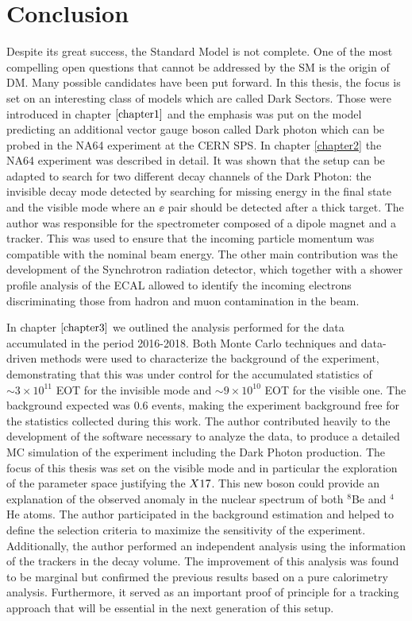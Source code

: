 
\chapter{Conclusion}

\label{chapter6}

Despite its great success, the Standard Model is not complete. One of the most compelling open questions that cannot be addressed by the SM is the origin of DM. Many possible candidates have been put forward. In this thesis, the focus is set on an interesting class of models which are called Dark Sectors. Those were introduced in chapter $\ref{chapter1}$ and the emphasis was put on the model predicting an additional vector gauge boson called Dark photon which can be probed in the NA64 experiment at the CERN SPS. In chapter \ref{chapter2} the NA64 experiment was described in detail. It was shown that the setup can be adapted to search for two different decay channels of the Dark Photon: the invisible decay mode detected by searching for missing energy in the final state and the visible mode where an $\ee$ pair should be detected after a thick target. The author was responsible for the spectrometer composed of a dipole magnet and a tracker. This was used to ensure that the incoming particle momentum was compatible with the nominal beam energy. The other main contribution was the development of the Synchrotron radiation detector, which together with a shower profile analysis of the ECAL allowed to identify the incoming electrons discriminating those from hadron and muon contamination in the beam.

In chapter $\ref{chapter3}$ we outlined the analysis performed for the data accumulated in the period 2016-2018. Both Monte Carlo techniques and data-driven methods were used to characterize the background of the experiment, demonstrating that this was under control for the accumulated statistics of $\sim 3 \times 10^{11}$ EOT for the invisible mode and $\sim 9 \times 10^{10}$ EOT for the visible one. The background expected was 0.6 events, making the experiment background free for the statistics collected during this work. The author contributed heavily to the development of the software necessary to analyze the data, to produce a detailed MC simulation of the experiment including the Dark Photon production. The focus of this thesis was set on the visible mode and in particular the exploration of the parameter space justifying the $X17$. This new boson could provide an explanation of the observed anomaly in the nuclear spectrum of both $^8$Be and $^4$He atoms. The author participated in the background estimation and helped to define the selection criteria to maximize the sensitivity of the experiment. Additionally, the author performed an independent analysis using the information of the trackers in the decay volume. The improvement of this analysis was found to be marginal but confirmed the previous results based on a pure calorimetry analysis. Furthermore, it served as an important proof of principle for a tracking approach that will be essential in the next generation of this setup.

